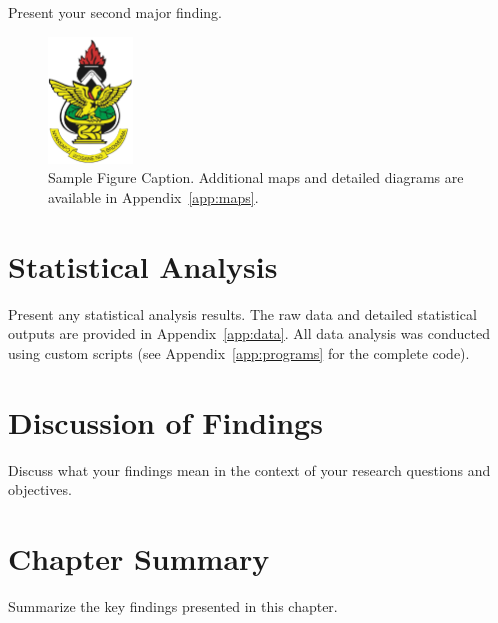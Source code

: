 Present your second major finding.

\begin{figure}[htbp]
\centering
\includegraphics[width=0.2\textwidth]{images/knust-logo.png}
\singlespace
\caption{Sample Figure Caption. Additional maps and detailed diagrams are available in Appendix~\ref{app:maps}.}
\label{fig:sample}
\endsinglespace
\end{figure}

\section{Statistical Analysis}

Present any statistical analysis results. The raw data and detailed statistical outputs are provided in Appendix~\ref{app:data}. All data analysis was conducted using custom scripts (see Appendix~\ref{app:programs} for the complete code).

\section{Discussion of Findings}

Discuss what your findings mean in the context of your research questions and objectives.

\section{Chapter Summary}

Summarize the key findings presented in this chapter.
